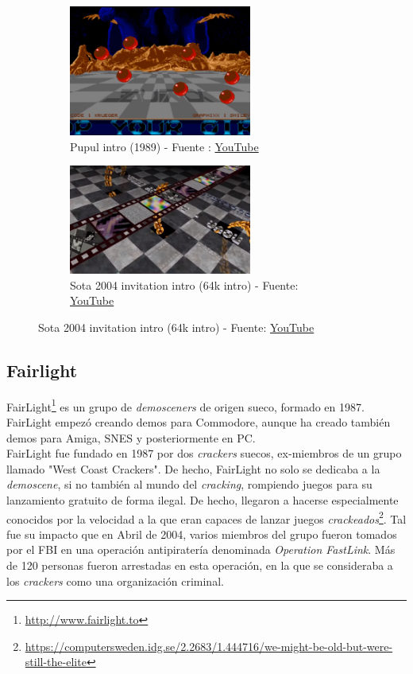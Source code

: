 \begin{figure}[h]
	\centering
	\begin{subfigure}[b]{0.45\textwidth}
		\centering
		\includegraphics[width=6cm]{archivos/equinox1}
		\caption{Pupul intro (1989) - Fuente : \href{https://www.youtube.com/watch?v=efjEJIj5rhM}{YouTube}}
		\label{fig:equinox1}
	\end{subfigure}
	\begin{subfigure}[b]{0.45\textwidth}
		\centering
		\includegraphics[width=6cm]{archivos/equinox2}
		\caption{Sota 2004 invitation intro (64k intro) - Fuente: \href{https://www.youtube.com/watch?v=cb8i0WYDLxM}{YouTube}}
		\label{fig:equinox2}
	\end{subfigure}
\end{figure}

\subsection{Fairlight}

FairLight\footnote{\url{http://www.fairlight.to}} es un grupo de \emph{demosceners} de origen sueco, formado en 1987. FairLight empezó creando demos para Commodore, aunque ha creado también demos para Amiga, SNES y posteriormente en PC.\\

FairLight fue fundado en 1987 por dos \emph{crackers} suecos, ex-miembros de un grupo llamado "West Coast Crackers". De hecho, FairLight no solo se dedicaba a la \emph{demoscene}, si no también al mundo del \emph{cracking}, rompiendo juegos para su lanzamiento gratuito de forma ilegal. De hecho, llegaron a hacerse especialmente conocidos por la velocidad a la que eran capaces de lanzar juegos \emph{crackeados}\footnote{\url{https://computersweden.idg.se/2.2683/1.444716/we-might-be-old-but-were-still-the-elite}}. Tal fue su impacto que en Abril de 2004, varios miembros del grupo fueron tomados por el FBI en una operación antipiratería denominada \emph{Operation FastLink}. Más de 120 personas fueron arrestadas en esta operación, en la que se consideraba a los \emph{crackers} como una organización criminal.\\


